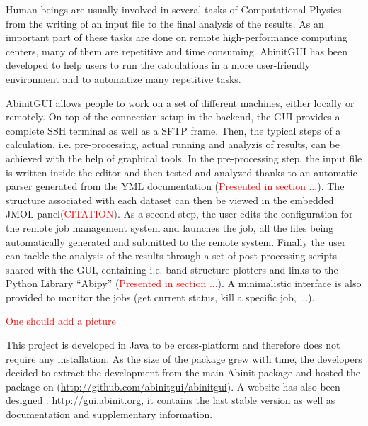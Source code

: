 Human beings are usually involved in several tasks of Computational Physics 
from the writing of an input file to the final analysis of the results. As an 
important part of these tasks are done on remote high-performance 
computing centers, many of them are repetitive and time consuming.
AbinitGUI has been developed to help users to run the calculations in a more 
user-friendly environment and to automatize many repetitive tasks.

AbinitGUI allows people to work on a set of different machines, either locally 
or remotely. On top of the connection setup in the backend, the GUI provides a 
complete SSH terminal as well as a SFTP frame. Then, the typical steps of a 
calculation, i.e. pre-processing, actual running and analyzis of results, can 
be achieved with the help of graphical tools. In the pre-processing 
step, the input file is written inside the editor and then tested and 
analyzed thanks to an automatic parser generated from the YML documentation 
(\textcolor{red}{Presented in section ...}). The structure associated with 
each dataset can then be viewed in the embedded JMOL 
panel(\textcolor{red}{CITATION}).
As a second step, the user edits the configuration for the remote job 
management system and launches the job, all the files being automatically 
generated and submitted to the remote system.
Finally the user can tackle the analysis of the results through a 
set of post-processing scripts shared with the GUI, containing i.e. band 
structure plotters and links to the Python Library ``Abipy'' 
(\textcolor{red}{Presented in section ...}). 
A minimalistic interface is also provided to monitor the jobs (get 
current status, kill a specific job, ...).

\textcolor{red}{One should add a picture}

This project is developed in Java to be cross-platform and therefore does not 
require any installation. As the size of the package grew with time, the 
developers decided to extract the development from the main Abinit package and 
hosted the package on (\url{http://github.com/abinitgui/abinitgui}). A website 
has also been designed : \url{http://gui.abinit.org}, it contains the last 
stable version as well as documentation and supplementary information.